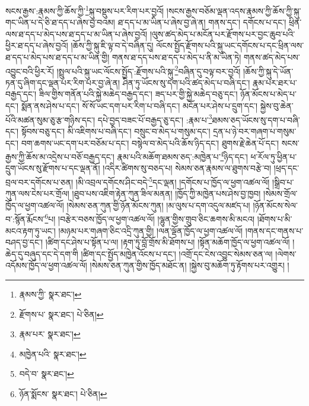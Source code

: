 སངས་རྒྱས་:རྣམས་ཀྱི་ཆོས་ཀྱི་\footnote{རྣམས་ཀྱི་  སྣར་ཐང་། }སྐུ་བསྡུས་པར་རིག་པར་བྱའོ། །སངས་རྒྱས་བཅོམ་ལྡན་འདས་རྣམས་ཀྱི་ཆོས་ཀྱི་སྐུ་གང་ཡིན་པ་དེ་ཅི་ཐ་དད་པ་ཞེས་བྱ་བའམ། ཐ་དད་པ་མ་ཡིན་པ་ཞེས་བྱ་ཞེ་ན། གནས་དང་། དགོངས་པ་དང་། ཕྲིན་ལས་ཐ་དད་པ་མེད་པས་ཐ་དད་པ་མ་ཡིན་པ་ཞེས་བྱའོ། །ལུས་ཚད་མེད་པ་མངོན་པར་རྫོགས་པར་བྱང་ཆུབ་པའི་ཕྱིར་ཐ་དད་པ་ཞེས་བྱའོ། །ཆོས་ཀྱི་སྐུ་ཇི་ལྟ་བ་དེ་བཞིན་དུ། ལོངས་སྤྱོད་རྫོགས་པའི་སྐུ་ཡང་དགོངས་པ་དང་ཕྲིན་ལས་ཐ་དད་པ་མེད་པས་ཐ་དད་པ་མ་ཡིན་གྱི། གནས་ཐ་དད་པས་ཐ་དད་པ་མེད་པ་ནི་མ་ཡིན་ཏེ། གནས་ཚད་མེད་པས་འབྱུང་བའི་ཕྱིར་རོ། །སྤྲུལ་པའི་སྐུ་ཡང་ལོངས་སྤྱོད་:རྫོགས་པའི་སྐུ་\footnote{རྫོགས་པ་  སྣར་ཐང་།  པེ་ཅིན། }བཞིན་དུ་བལྟ་བར་བྱའོ། །ཆོས་ཀྱི་སྐུ་དེ་ཡོན་ཏན་དུ་ཞིག་དང་ལྡན་པར་རིག་པར་བྱ་ཞེ་ན། ཤིན་ཏུ་ཡོངས་སུ་དག་པའི་ཚད་མེད་པ་བཞི་དང་། རྣམ་པར་ཐར་པ་བརྒྱད་དང་། ཟིལ་གྱིས་གནོན་པའི་སྐྱེ་མཆེད་བརྒྱད་དང་། ཟད་པར་གྱི་སྐྱེ་མཆེད་བཅུ་དང་། ཉོན་མོངས་པ་མེད་པ་དང་། སྨོན་ནས་ཤེས་པ་དང་། སོ་སོ་ཡང་དག་པར་རིག་པ་བཞི་དང་། མངོན་པར་ཤེས་པ་དྲུག་དང་། སྐྱེས་བུ་ཆེན་པོའི་མཚན་སུམ་ཅུ་རྩ་གཉིས་དང་། དཔེ་བྱད་བཟང་པོ་བརྒྱད་ཅུ་དང་། :རྣམ་པ་\footnote{རྣམ་པར་  སྣར་ཐང་། }ཐམས་ཅད་ཡོངས་སུ་དག་པ་བཞི་དང་། སྟོབས་བཅུ་དང་། མི་འཇིགས་པ་བཞི་དང་། བསྲུང་བ་མེད་པ་གསུམ་དང་། དྲན་པ་ཉེ་བར་གཞག་པ་གསུམ་དང་། བག་ཆགས་ཡང་དག་པར་བཅོམ་པ་དང་། བསྙེལ་བ་མེད་པའི་ཆོས་ཉིད་དང་། ཐུགས་རྗེ་ཆེན་པོ་དང་། སངས་རྒྱས་ཀྱི་ཆོས་མ་འདྲེས་པ་བཅོ་བརྒྱད་དང་། རྣམ་པའི་མཆོག་ཐམས་ཅད་:མཁྱེན་པ་\footnote{མཁྱེན་པའི་  སྣར་ཐང་། }ཉིད་དང་། ཕ་རོལ་ཏུ་ཕྱིན་པ་དྲུག་ཡོངས་སུ་རྫོགས་པ་དང་ལྡན་ནོ། །འདིར་ཚིགས་སུ་བཅད་པ། སེམས་ཅན་རྣམས་ལ་ཐུགས་བརྩེ་བ། །ཕྲད་དང་བྲལ་བར་དགོངས་པ་ཅན། །མི་འབྲལ་དགོངས་ཤིང་བདེ་\footnote{བདེ་བ་  སྣར་ཐང་། }དང་ལྡན། །དགོངས་པ་ཁྱོད་ལ་ཕྱག་འཚལ་ལོ། །སྒྲིབ་པ་ཀུན་ལས་ངེས་པར་གྲོལ། །ཐུབ་པས་འཇིག་རྟེན་ཀུན་ཟིལ་མནན། །ཁྱོད་ཀྱི་མཁྱེན་པས་ཤེས་བྱ་ཁྱབ། །སེམས་གྲོལ་ཁྱོད་ལ་ཕྱག་འཚལ་ལོ། །སེམས་ཅན་ཀུན་གྱི་ཉོན་མོངས་ཀུན། །མ་ལུས་པ་དག་འདུལ་མཛད་པ། །ཉོན་མོངས་སེལ་བ་:སྙོན་རྨོངས་\footnote{ཉོན་སྨོངས་  སྣར་ཐང་།  པེ་ཅིན། }པ། །བརྩེར་བཅས་ཁྱོད་ལ་ཕྱག་འཚལ་ལོ། །ལྷུན་གྱིས་གྲུབ་ཅིང་ཆགས་མི་མངའ། །ཐོགས་པ་མི་མངའ་རྟག་ཏུ་ཡང་། །མཉམ་པར་གཞག་ཅིང་འདྲི་ཀུན་གྱི། །ལན་ལྡོན་ཁྱོད་ལ་ཕྱག་འཚལ་ལོ། །གནས་དང་གནས་པ་བཤད་བྱ་དང་། །ཚིག་དང་ཤེས་པ་སྟོན་པ་ལ། །རྟག་ཏུ་བློ་གྲོས་མི་ཐོགས་པ། །སྟོན་མཆོག་ཁྱོད་ལ་ཕྱག་འཚལ་ལོ། །ཆེད་དུ་བཞུད་དང་དེ་དག་གི །ཚིག་དང་སྤྱོད་མཁྱེན་འོངས་པ་དང་། །འགྲོ་དང་ངེས་འབྱུང་སེམས་ཅན་ལ། །ལེགས་འདོམས་ཁྱོད་ལ་ཕྱག་འཚལ་ལོ། །སེམས་ཅན་ཀུན་གྱིས་ཁྱོད་མཐོང་ན། །སྐྱེས་བུ་མཆོག་ཏུ་རྟོགས་པར་འགྱུར། །
